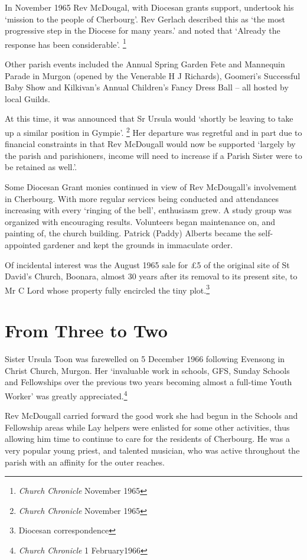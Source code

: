 In November 1965 Rev McDougal, with Diocesan grants support, undertook his `mission to the people of Cherbourg'. Rev Gerlach described this as `the most progressive step in the Diocese for many years.' and noted that `Already the response has been considerable'. \footnote{\emph{Church Chronicle} November 1965}


Other parish events included the Annual Spring Garden Fete and Mannequin Parade in Murgon (opened by the Venerable H J Richards), Goomeri's Successful Baby Show and Kilkivan's Annual Children's Fancy Dress Ball -- all hosted by local Guilds.



At this time, it was announced that Sr Ursula would `shortly be leaving to take up a similar position in Gympie'. \footnote{\emph{Church Chronicle} November 1965} Her departure was regretful and in part due to financial constraints in that Rev McDougall would now be supported `largely by the parish and parishioners, income will need to increase if a Parish Sister were to be retained as well.'.


Some Diocesan Grant monies continued in view of Rev McDougall's involvement in Cherbourg. With more regular services being conducted and attendances increasing with every `ringing of the bell', enthusiasm grew. A study group was organized with encouraging results. Volunteers began maintenance on, and painting of, the church building. Patrick (Paddy) Alberts became the self-appointed gardener and kept the grounds in immaculate order.



Of incidental interest was the August 1965 sale for \pounds5 of the original site of St David's Church, Boonara, almost 30 years after its removal to its present site, to Mr C Lord whose property fully encircled the tiny plot.\footnote{Diocesan correspondence}


\section{From Three to Two}



Sister Ursula Toon was farewelled on 5 December 1966 following Evensong in Christ Church, Murgon. Her `invaluable work in schools, GFS, Sunday Schools and Fellowships over the previous two years becoming almost a full-time Youth Worker' was greatly appreciated.\footnote{\emph{Church Chronicle} 1 February1966}


Rev McDougall carried forward the good work she had begun in the Schools and Fellowship areas while Lay helpers were enlisted for some other activities, thus allowing him time to continue to care for the residents of Cherbourg. He was a very popular young priest, and talented musician, who was active throughout the parish with an affinity for the outer reaches.



